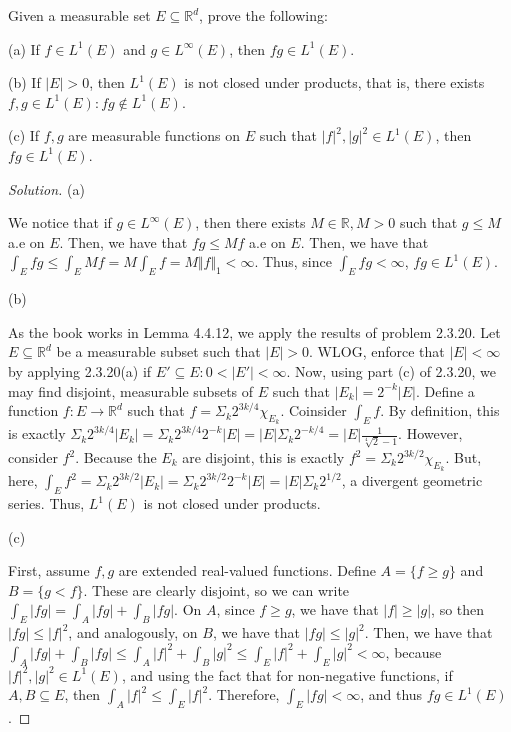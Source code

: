 \documentclass[10pt]{article}
\newenvironment{problem}[2][Problem]{\begin{trivlist}
\item[\hskip \labelsep {\bfseries #1}\hskip \labelsep {\bfseries #2.}]}{\end{trivlist}}
\begin{document}
\begin{problem}{4.4.21}
Given a measurable set $E \subseteq\mathbb{R}^d$, prove the following:

(a) If $f \in L^1(E)$ and $g \in L^\infty(E)$, then $fg \in L^1(E)$.

(b) If $|E| > 0$, then $L^1(E)$ is not closed under products, that is, there exists $f,g \in L^1(E) : fg \not \in L^1(E)$.

(c) If $f,g$ are measurable functions on $E$ such that $|f|^2, |g|^2 \in L^1(E)$, then $fg \in L^1(E)$.
\end{problem}
\begin{proof}[Solution]

(a)

We notice that if $g \in L^\infty(E)$, then there exists $M \in \mathbb{R}, M > 0$ such that $g \leq M$ a.e on $E$. Then, we have that $fg \leq Mf$ a.e on $E$. Then, we have that $\int_E fg \leq \int_E Mf = M \int_E f = M \Vert f \Vert_1 < \infty$. Thus, since $\int_E fg < \infty$, $fg \in L^1(E)$.

(b)

As the book works in Lemma 4.4.12, we apply the results of problem 2.3.20. Let $E \subseteq \mathbb{R}^d$ be a measurable subset such that $|E| > 0$. WLOG, enforce that $|E| < \infty$ by applying 2.3.20(a) if $E' \subseteq E : 0 < |E'| < \infty$. Now, using part (c) of 2.3.20, we may find disjoint, measurable subsets of $E$ such that  $|E_k| = 2^{-k} |E|$. Define a function $f: E \to \mathbb{R}^d$ such that $f = \Sigma_k 2^{3k/4} \chi_{E_k}$. Coinsider $\int_E f$. By definition, this is exactly $\Sigma_k 2^{3k/4} |E_k|= \Sigma_k 2^{3k/4} 2^{-k} |E| =  |E| \Sigma_k 2^{-k/4} =  |E| \frac{1}{\sqrt[4]{2} -1}$. However, consider $f^2$. Because the $E_k$ are disjoint, this is exactly $f^2 =  \Sigma_k 2^{3k/2} \chi_{E_k}$. But, here, $\int_E f^2 = \Sigma_k 2^{3k/2} |E_k|= \Sigma_k 2^{3k/2} 2^{-k} |E|= |E| \Sigma_k 2^{1/2}$, a divergent geometric series. Thus, $L^1(E)$ is not closed under products. 

(c)

First, assume $f,g$ are extended real-valued functions. Define $A = \{ f \geq g \}$ and $B = \{ g < f \}$. These are clearly disjoint, so we can write $\int_E |fg| = \int_A |fg| + \int_B |fg|$. On $A$, since $f \geq g$, we have that $|f| \geq |g|$, so then $|fg| \leq |f|^2$, and analogously, on $B$, we have that $|fg| \leq |g|^2$. Then, we have that $\int_A |fg| + \int_B |fg| \leq \int_A |f|^2 + \int_B |g|^2 \leq \int_E |f|^2 + \int_E |g|^2 < \infty $, because $|f|^2, |g|^2 \in L^1(E)$, and using the fact that for non-negative functions, if $A, B\subseteq E$, then $\int_A |f|^2 \leq \int_E |f|^2$. Therefore, $\int_E |fg| < \infty$, and thus $fg \in L^1(E)$.


\end{proof}
\end{document}
